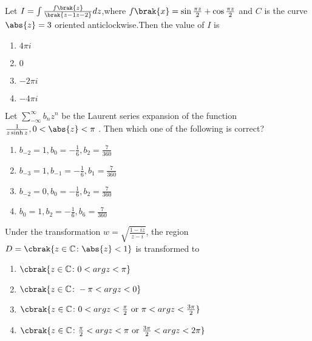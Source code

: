\iffalse
\chapter{2010}
\author{EE24BTECH11011}
\section{ma}
\fi
	\item Let $I = \int {\frac{f\brak{z}}{\brak{{z-1}{z-2}}}}dz$,where $f\brak{x} = \sin{\frac{\pi z}{2}} + \cos{\frac{\pi z}{2}}$ and $C$ is the curve $\abs{z} = 3$
oriented anticlockwise.Then the value of $I$ is 
\begin{enumerate}
\item $4\pi i$
\item $0$
\item $-2\pi i$
\item $-4 \pi i$\\
\end{enumerate}
\item  Let $\sum_{-\infty}^{\infty}b_n z^n$ be the Laurent series expansion of the function $\frac{1}{z\sinh{z}} , 0<\abs{z}<\pi$ . Then which one of the following is correct?
\begin{multicols}{2}
\begin{enumerate}
    \item $b_{-2} = 1 ,b_0 = -\frac{1}{6} , b_2 = \frac{7}{360}$\\
    \item $b_{-3} = 1 ,b_{-1} = -\frac{1}{6} , b_1 = \frac{7}{360}$
    \item $b_{-2} = 0 ,b_0 = -\frac{1}{6} , b_2 = \frac{7}{360}$\\
    \item $b_{0} = 1 ,b_2 = -\frac{1}{6} , b_6 = \frac{7}{360}$
\end{enumerate}
\end{multicols}
\item Under the transformation $w = \sqrt{\frac{1-iz}{z-i}}$, the region $D = \cbrak{z \in \mathbb{C}\colon \abs{z}<1}$ is transformed to
\begin{enumerate}
    \item $\cbrak{z \in \mathbb{C}\colon 0<arg z<\pi}$
    \item $\cbrak{z \in \mathbb{C}\colon -\pi<arg z<0}$
    \item $\cbrak{z \in \mathbb{C}\colon 0<arg z<\frac{\pi}{2} \text{ or } \pi < arg z < \frac{3\pi}{2}}$
    \item $\cbrak{z \in \mathbb{C}\colon \frac{\pi}{2}<arg z<\pi \text{ or } \frac{3\pi}{2}< arg z < 2\pi}$\\
\end{enumerate}
